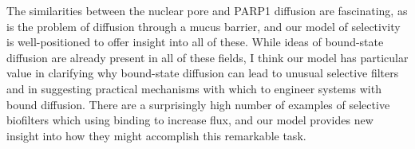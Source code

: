The similarities between the nuclear pore and PARP1 diffusion are fascinating, as is the problem of diffusion through a mucus barrier, and our model of selectivity is well-positioned to offer insight into all of these.  While ideas of bound-state diffusion are already present in all of these fields, I think our model has particular value in clarifying why bound-state diffusion can lead to unusual selective filters and in suggesting practical mechanisms with which to engineer systems with bound diffusion.  There are a surprisingly high number of examples of selective biofilters which using binding to increase flux, and our model provides new insight into how they might accomplish this remarkable task.


